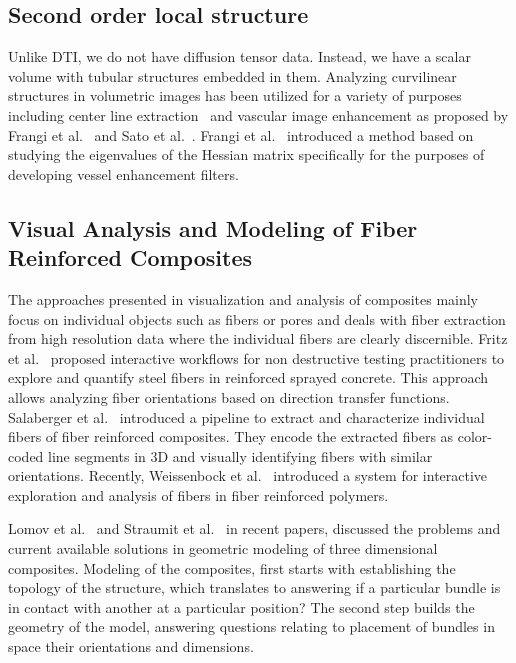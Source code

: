 \subsection{Second order local structure}
Unlike DTI, we do not have diffusion tensor data. Instead, we have a scalar volume with tubular structures embedded in them. Analyzing curvilinear structures in volumetric images has been utilized for a variety of purposes including center line extraction~\cite{Bouix2005} and vascular image enhancement as proposed by Frangi et al.~\cite{Frangi1998} and Sato et al.~\cite{Sato1997}. Frangi et al.~\cite{Frangi1998} introduced a method based on studying the eigenvalues of the  Hessian matrix specifically for the purposes of developing vessel enhancement filters.


\subsection {Visual Analysis and Modeling of Fiber Reinforced Composites}
The approaches presented in visualization and analysis of composites mainly focus on individual objects such as fibers or pores and deals with fiber extraction from high resolution data where the individual fibers are clearly discernible. Fritz et al.~\cite{Fritz2009} proposed interactive workflows for non destructive testing practitioners to explore and quantify steel fibers in reinforced sprayed concrete. This approach allows analyzing fiber orientations based on direction transfer functions. Salaberger et al.~\cite{Salaberger2011} introduced a pipeline to extract and characterize individual fibers of fiber reinforced composites. They encode the extracted fibers as color-coded line segments in 3D and visually identifying fibers with similar orientations. Recently, Weissenbock et al.~\cite{Weissenbock2014} introduced a system for interactive exploration and analysis of fibers in fiber reinforced polymers. 

Lomov et al.~\cite{Lomov2010, Lomov2001} and Straumit et al.~\cite{Straumit2014} in recent papers, discussed the problems and current available solutions in geometric modeling of three dimensional composites. Modeling of the composites, first starts with establishing the topology of the structure, which translates to answering if a particular bundle is in contact with another at a particular position? The second step builds the geometry of the model, answering questions relating to placement of bundles in space their orientations and dimensions. 

